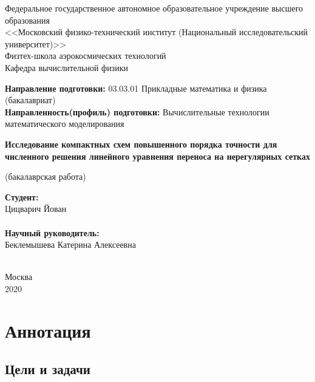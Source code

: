 \documentclass[14pt]{article}
\begin{document}
\begin{center}
\small
Федеральное государственное автономное образовательное учреждение высшего образования\\
<<Московский физико-технический институт (Национальный исследовательский университет)>> \\
Физтех-школа аэрокосмических технологий\\
Кафедра вычислительной физики
\end{center}

\begin{flushleft}
\small
\textbf{Направление подготовки:} 03.03.01 Прикладные математика и физика (бакалавриат)\\
\textbf{Направленность(профиль) подготовки:} Вычислительные технологии математического моделирования\\
\end{flushleft}

\begin{center}
\LARGE
\textbf{Исследование компактных схем повышенного порядка точности для численного решения линейного уравнения переноса на нерегулярных сетках}

\small(бакалаврская работа)
\end{center}


\begin{flushright}

\noindent
\textbf{Студент:} \\
Цицварич Йован\\
\underline{\hspace{3cm}}\\
\textbf{Научный руководитель:}\\
Беклемышева Катерина Алексеевна\\
\underline{\hspace{3cm}}\\

\end{flushright}

\begin{center}
\small
Москва\\
2020
\end{center}

\newpage
\section*{Аннотация}
\subsection*{Цели и задачи}
\end{document}
